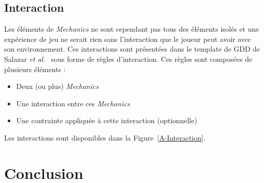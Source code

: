 \subsection{Interaction}
Les éléments de \emph{Mechanics} ne sont cependant pas tous des éléments isolés et une expérience de jeu ne serait rien sans l'interaction que le joueur peut avoir avec son environnement.
Ces interactions sont présentées dans le template de GDD de Salazar \emph{et al.}~\cite{salazar_gdd} sous forme de règles d'interaction.
Ces règles sont composées de plusieurs éléments :
\begin{itemize}
    \item Deux (ou plus) \emph{Mechanics} 
    \item Une interaction entre ces \emph{Mechanics}
    \item Une contrainte appliquée à cette interaction (optionnelle)
\end{itemize}
Les interactions sont disponibles dans la Figure~\ref{A-Interaction}.

\section{Conclusion}


